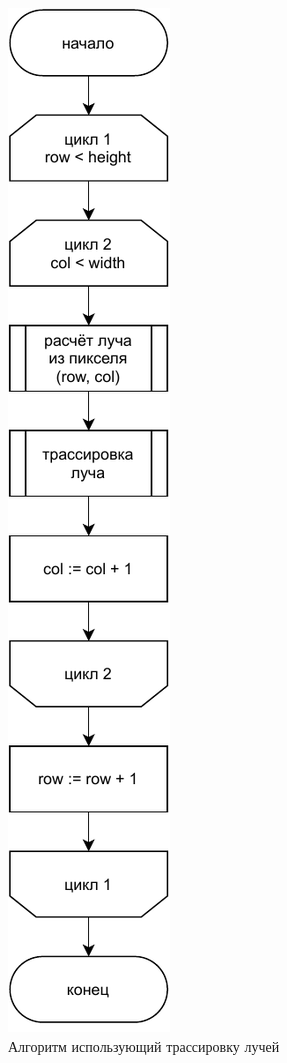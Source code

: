 \begin{figure}[h]
	\centering
	\includegraphics[width=\linewidth,height=0.7\textheight,keepaspectratio]{diagrams/fancy.pdf}
	\caption{Алгоритм использующий трассировку лучей}
	\label{alg:fancy}
\end{figure}

